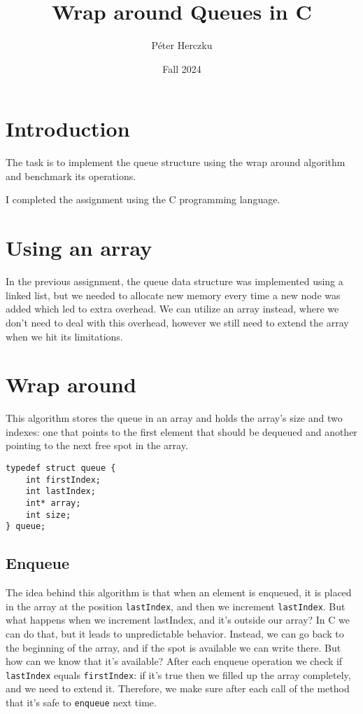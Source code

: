 \documentclass[a4paper,11pt]{article}
\begin{document}
    \title{
        \textbf{Wrap around Queues in C}
    }
    \author{Péter Herczku}
    \date{Fall 2024}

    \maketitle

    \section*{Introduction}

    The task is to implement the queue structure using the wrap around algorithm and benchmark its operations.

    I completed the assignment using the C programming language.

    \section*{Using an array}

    In the previous assignment, the queue data structure was implemented using a linked list, but we needed to allocate new memory every time a new node was added which led to extra overhead.
    We can utilize an array instead, where we don't need to deal with this overhead, however we still need to extend the array when we hit its limitations.

    \section*{Wrap around}

    This algorithm stores the queue in an array and holds the array's size and two indexes: one that points to the first element that should be dequeued and another pointing to the next free spot in the array.

    \begin{verbatim}
typedef struct queue {
    int firstIndex;
    int lastIndex;
    int* array;
    int size;
} queue;
    \end{verbatim}

    \subsection*{Enqueue}

    The idea behind this algorithm is that when an element is enqueued, it is placed in the array at the position {\tt lastIndex}, and then we increment {\tt lastIndex}.
    But what happens when we increment lastIndex, and it's outside our array?
    In C we can do that, but it leads to unpredictable behavior.
    Instead, we can go back to the beginning of the array, and if the spot is available we can write there.
    But how can we know that it's available?
    After each enqueue operation we check if {\tt lastIndex} equals {\tt firstIndex}: if it's true then we filled up the array completely, and we need to extend it.
    Therefore, we make sure after each call of the method that it's safe to {\tt enqueue} next time.
\end{document}
